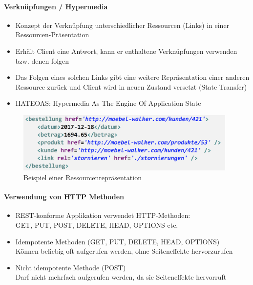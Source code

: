 \documentclass[a4paper]{article}
\begin{document}
			\paragraph{Verknüpfungen / Hypermedia}
			
				\begin{itemize}
					\item Konzept der Verknüpfung unterschiedlicher Ressourcen (Links) in einer Ressourcen-Präsentation
					\item Erhält Client eine Antwort, kann er enthaltene Verknüpfungen verwenden bzw. denen folgen
					\item Das Folgen eines solchen Links gibt eine weitere Repräsentation einer anderen Ressource zurück und Client wird in neuen Zustand versetzt (State Transfer)
					\item HATEOAS: Hypermedia As The Engine Of Application State
				\end{itemize}
			
				\begin{figure}[!htb]
					\centering
					\includegraphics[keepaspectratio, height=3cm]{img/ws/bsp_hateoas.png}
					\caption{Beispiel einer Ressourcenrepräsentation}
					\label{fig:hateoas_res}
				\end{figure}
			
		\newpage
		
			\paragraph{Verwendung von HTTP Methoden}
			
				\begin{itemize}
					\item REST-konforme Applikation verwendet HTTP-Methoden:\\
					GET, PUT, POST, DELETE, HEAD, OPTIONS etc.
					
					\item Idempotente Methoden (GET, PUT, DELETE, HEAD, OPTIONS)\\
					Können beliebig oft aufgerufen werden, ohne Seiteneffekte hervorzurufen
					
					\item Nicht idempotente Methode (POST)\\
					Darf nicht mehrfach aufgerufen werden, da sie Seiteneffekte hervorruft
				\end{itemize}
			
\end{document}

